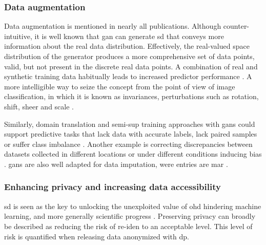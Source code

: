         \subsubsection{Data augmentation}\label{sec:augmentation}
    
            Data augmentation  is mentioned in nearly all publications. Although counter-intuitive, it is well known that \gls{gan} can generate \gls{sd} that conveys more information about the real data distribution. Effectively, the real-valued space distribution of the generator produces a more comprehensive set of data points, valid, but not present in the discrete real data points. A combination of real and synthetic training data habitually leads to increased predictor performance \cite{Wang_2019,Che_2017,Yoon2018-ite, yoon2018imputation, Yang_2019_impute_ehr, Chen_2019, cui2019conan, Che_2017}. A more intelligible way to seize the concept from the point of view of image classification, in which it is known as invariances, perturbations such as rotation, shift, sheer and scale \cite{antoniou2017data}.\par 
            
            Similarly, domain translation  and \gls{semi-sup} training approaches with \glspl{gan} could support predictive tasks that lack data with accurate labels, lack paired samples or suffer class imbalance \cite{Che_2017,mcdermott2018semi, Yoon2018-ite}. Another example is correcting discrepancies between datasets collected in different locations or under different conditions inducing bias \cite{Yoon2018-radial}. \glspl{gan} are also well adapted for data imputation, were  entries are \gls{mar} \cite{yoon2018imputation}. 

        \subsubsection{Enhancing privacy and increasing data accessibility}\label{sec:access_privacy}
    
            \gls{sd} is seen as the key to unlocking the unexploited value of \gls{ohd} hindering machine learning, and more generally scientific progress \cite{Beaulieu-Jones2019-ct, baowaly_2019_IEEE,baowaly_2019_jamia,Che_2017,esteban2017real,Fisher2019,severo2019ward2icu}. Preserving privacy can broadly be described as reducing the risk of \gls{re-iden} to an acceptable level. This level of risk is quantified when releasing data anonymized with \gls{dp}.\par
    
